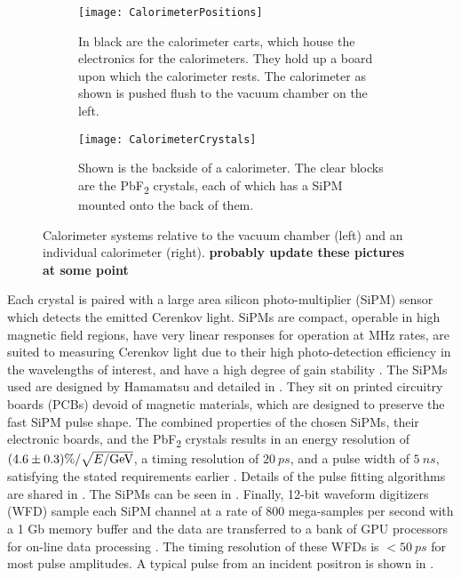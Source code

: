\begin{figure}[]
\centering
    \begin{subfigure}[t]{0.43\textwidth}
        \centering
        \texttt{[image: CalorimeterPositions]}
        \caption{In black are the calorimeter carts, which house the electronics for the calorimeters. They hold up a board upon which the calorimeter rests. The calorimeter as shown is pushed flush to the vacuum chamber on the left.}
    \label{fig:CalorimeterPositions}
    \end{subfigure}%
    \hspace{1cm}
    \begin{subfigure}[t]{0.47\textwidth}
        \centering
        \texttt{[image: CalorimeterCrystals]}
        \caption{Shown is the backside of a calorimeter. The clear blocks are the PbF\textsubscript{2} crystals, each of which has a SiPM mounted onto the back of them.}
    \label{fig:CalorimeterCrystals}
    \end{subfigure}
\caption[Calorimeters]{Calorimeter systems relative to the vacuum chamber (left) and an individual calorimeter (right). \bf{probably update these pictures at some point}}
\label{fig:calos}
\end{figure}



Each crystal is paired with a large area silicon photo-multiplier (SiPM) sensor which detects the emitted Cerenkov light. SiPMs are compact, operable in high magnetic field regions, have very linear responses for operation at MHz rates, are suited to measuring Cerenkov light due to their high photo-detection efficiency in the wavelengths of interest, and have a high degree of gain stability \cite{Kaspar:2016ofv}. The SiPMs used are designed by Hamamatsu and detailed in . They sit on printed circuitry boards (PCBs) devoid of magnetic materials, which are designed to preserve the fast SiPM pulse shape. The combined properties of the chosen SiPMs, their electronic boards, and the PbF\textsubscript{2} crystals results in an energy resolution of $(4.6 \pm 0.3) \% / \sqrt{E/\text{G\text{e\kern-0.15ex V}}}$, a timing resolution of $\SI{20}{ps}$, and a pulse width of $\SI{5}{ns}$, satisfying the stated requirements earlier \cite{Fienberg:2014kka,Kaspar:2016ofv}. Details of the pulse fitting algorithms are shared in . The SiPMs can be seen in . Finally, 12-bit waveform digitizers (WFD) sample each SiPM channel at a rate of 800 mega-samples per second with a 1 Gb memory buffer and the data are transferred to a bank of GPU processors for on-line data processing \cite{Sweigart:2016jty}. The timing resolution of these WFDs is $<\SI{50}{ps}$ for most pulse amplitudes. A typical pulse from an incident positron is shown in .

